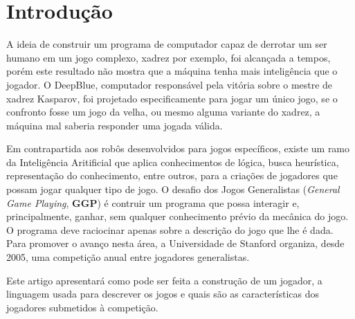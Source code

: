 \section{Introdução}
A ideia de construir um programa de computador capaz de derrotar um ser humano 
em um jogo complexo, xadrez por exemplo, foi alcançada a tempos, porém este 
resultado não mostra que a máquina tenha mais inteligência que o jogador. O 
DeepBlue, computador responsável pela vitória sobre o mestre de xadrez Kasparov, 
foi projetado especificamente para jogar um único jogo, se o confronto fosse um 
jogo da velha, ou mesmo alguma variante do xadrez, a máquina mal saberia 
responder uma jogada válida. 

Em contrapartida aos robôs desenvolvidos para jogos específicos, existe um ramo
da Inteligência Aritificial que aplica conhecimentos de lógica, busca 
heurística, representação do conhecimento, entre outros, para a criações de
jogadores que possam jogar qualquer tipo de jogo. 
O desafio dos Jogos Generalistas ({\it General Game Playing}, {\bf GGP}) é
contruir um programa que possa interagir e, principalmente, ganhar, sem qualquer
conhecimento prévio da mecânica do jogo. O programa deve raciocinar apenas sobre
a descrição do jogo que lhe é dada. Para promover o avanço nesta área, a
Universidade de Stanford organiza, desde 2005, uma competição anual entre
jogadores generalistas. 

Este artigo apresentará como pode ser feita a construção de um jogador, a
linguagem usada para descrever os jogos e quais são as características dos
jogadores submetidos à competição. 
